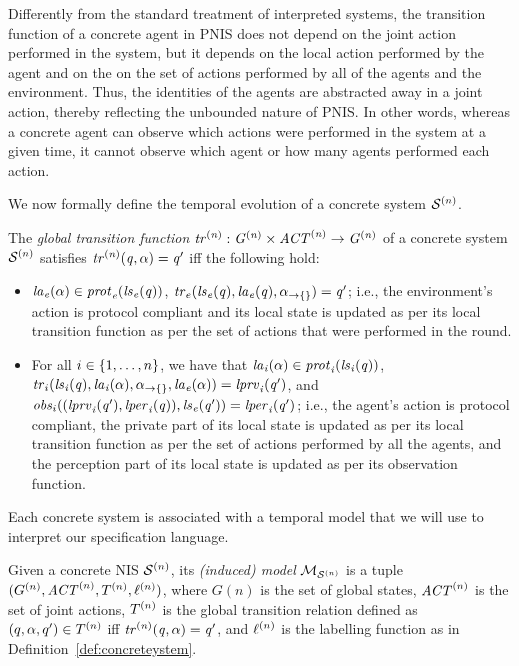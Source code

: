 Differently from the standard treatment of interpreted systems, the
transition function of a concrete agent in PNIS  does not depend on the joint
action performed in the system, but it depends on the local action performed by
the  agent and on the on the set of actions performed by all of the agents
and the environment.  Thus, the identities of the agents are abstracted away in
a joint action, thereby reflecting the unbounded nature of PNIS. In other words,
whereas  a concrete agent can observe which actions were performed in the system
at a given time,  it cannot observe which agent or how many agents performed
each action.

We now formally define the temporal evolution of a concrete system
$\mathcal{S}^{(n)}$.



\begin{definition} 
  \label{def:globaltransition}
  The {\em global transition function} $\it{tr}^{(n)} : G^{(n)}
  \times \mathit{ACT}^{(n)} \rightarrow G^{(n)}$ of a concrete system $\mathcal{S}^{(n)}$
  satisfies $\it{tr}^{(n)}(q, \alpha) = q'$ iff the following hold:
  \begin{itemize}[$\bullet$]
  \item $\it{la}_{e}({\alpha}) \in \mathit{prot}_{e}({\it{ls}_{e}(q)})$, $\mathit{tr}_{e}(\it{ls}_{e}(q),
  \it{la}_{e}({q}), \alpha_{\rightarrow\{\}}) = q'$; i.e., the environment’s action is
  protocol compliant and its local state is updated as per its local transition
  function as per the set of actions that were performed in the round.

  \item For all $i \in \left \{ 1,\ldots,n \right \}$, we have that $\it{la}_{i}({\alpha}) \in
  \mathit{prot}_{i}(\it{ls}_{i}(q))$, $\mathit{tr}_{i} (\it{ls}_{i}(q), \it{la}_{i}({\alpha}),
  \alpha_{\rightarrow\{\}}, \it{la}_{e}({\alpha})) = \it{lprv}_{i}(q')$, and $\mathit{obs}_{i}((\it{lprv}_{i}(q'),\it{lper}_{i}(q)),\it{ls}_{e}(q')) = \it{lper}_{i}(q')$; i.e., the agent's
  action is protocol compliant, the private part of its local state is updated
  as per its local transition function as per the set of actions performed by
  all the agents, and the perception part of its local state is updated as per
  its observation function.
  \end{itemize}
\end{definition}


Each concrete system is associated with a temporal model 
that we will use  to interpret our specification language.

\begin{definition}[Model]
  \label{def:model}
  Given a concrete NIS $\mathcal{S}^{(n)}$, its \emph{(induced) model} $\mathcal{M}_{\mathcal{S}^{(n)}}$ is a
  tuple $(G^{(n)}, \mathit{ACT}^{(n)}, T^{(n)}, \ell^{(n)})$,
  where $G(n)$ is the set of global states, $\mathit{ACT}^{(n)}$ is the set
  of joint actions, $T^{(n)}$ is the global transition relation defined as
  $(q, \alpha, q') \in T^{(n)}$ iff $\it{tr}^{(n)}(q, \alpha) = q'$, and
  $\ell^{(n)}$ is the labelling function as in
  Definition~\ref{def:concreteystem}.
\end{definition}

